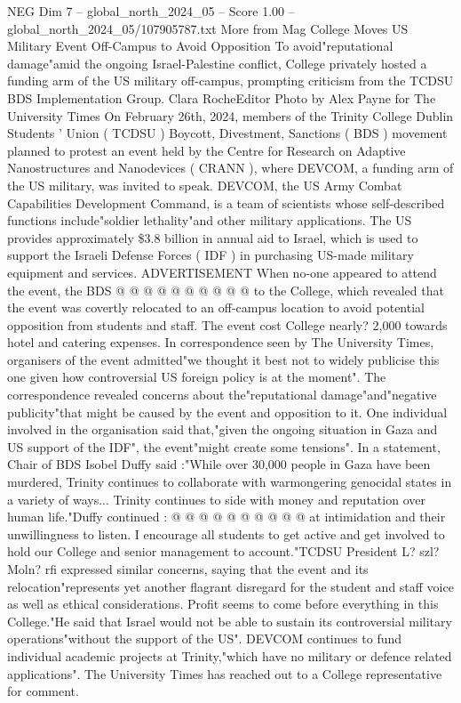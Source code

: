 \begin{textsample}{NEG Dim 7 – global\_north\_2024\_05 – Score 1.00 – global\_north\_2024\_05/107905787.txt}  \label{ex:f7_neg_403}
More from Mag College Moves US Military Event Off-Campus to Avoid Opposition To avoid"reputational damage"amid the ongoing Israel-Palestine conflict, College privately hosted a funding arm of the US military off-campus, prompting criticism from the TCDSU BDS Implementation Group.
Clara RocheEditor Photo by Alex Payne for The University Times On February 26th, 2024, members of the Trinity College Dublin Students ' Union ( TCDSU ) Boycott, Divestment, Sanctions ( BDS ) movement planned to protest an event held by the Centre for Research on Adaptive Nanostructures and Nanodevices ( CRANN ), where DEVCOM, a funding arm of the US military, was invited to speak.
DEVCOM, the US Army Combat Capabilities Development Command, is a team of scientists whose self-described functions include"soldier lethality"and other military applications.
The US provides approximately \$3.8 billion in annual aid to Israel, which is used to support the Israeli Defense Forces ( IDF ) in purchasing US-made military equipment and services.
ADVERTISEMENT When no-one appeared to attend the event, the BDS @ @ @ @ @ @ @ @ @ @ to the College, which revealed that the event was covertly relocated to an off-campus location to avoid potential opposition from students and staff.
The event cost College nearly? 2,000 towards hotel and catering expenses.
In correspondence seen by The University Times, organisers of the event admitted"we thought it best not to widely publicise this one given how controversial US foreign policy is at the moment".
The correspondence revealed concerns about the"reputational damage"and"negative publicity"that might be caused by the event and opposition to it.
One individual involved in the organisation said that,"given the ongoing situation in Gaza and US support of the IDF", the event"might create some tensions".
In a statement, Chair of BDS Isobel Duffy said :"While over 30,000 people in Gaza have been murdered, Trinity continues to collaborate with warmongering genocidal states in a variety of ways...
Trinity continues to side with money and reputation over human life."Duffy continued : @ @ @ @ @ @ @ @ @ @ at intimidation and their unwillingness to listen.
I encourage all students to get active and get involved to hold our College and senior management to account."TCDSU President L? szl?
Moln? rfi expressed similar concerns, saying that the event and its relocation"represents yet another flagrant disregard for the student and staff voice as well as ethical considerations.
Profit seems to come before everything in this College."He said that Israel would not be able to sustain its controversial military operations"without the support of the US".
DEVCOM continues to fund individual academic projects at Trinity,"which have no military or defence related applications".
The University Times has reached out to a College representative for comment.

\end{textsample}
